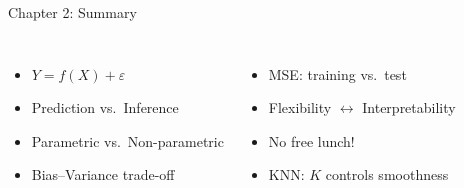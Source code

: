 \documentclass[aspectratio=169, 11pt]{beamer}
\begin{document}
\begin{frame}{Chapter 2: Summary}
\begin{columns}
\begin{itemize}
  \item $Y = f(X) + \varepsilon$
  \item Prediction vs.\ Inference
  \item Parametric vs.\ Non-parametric
  \item Bias--Variance trade-off
\end{itemize}

\begin{itemize}
  \item MSE: training vs.\ test
  \item Flexibility $\leftrightarrow$ Interpretability
  \item No free lunch!
  \item KNN: $K$ controls smoothness
\end{itemize}
\end{columns}

\vspace{1em}
\centering
{}
\end{frame}


\end{document}

